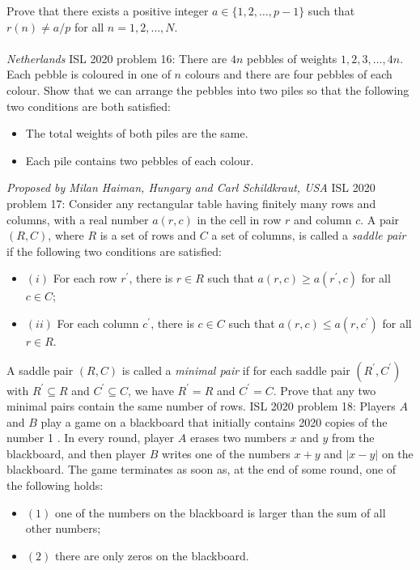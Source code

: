 Prove that there exists a positive integer $a \in \{ 1,2, \dots, p-1\}$ such that $r(n) \neq a/p$ for all $n = 1,2, \dots , N.$ \\\\
\textit{Netherlands} 
ISL 2020 problem 16:  There are $4n$ pebbles of weights $1, 2, 3, \dots, 4n.$ Each pebble is coloured in one of $n$ colours and there are four pebbles of each colour. Show that we can arrange the pebbles into two piles so that the following two conditions are both satisfied:
\begin{itemize}
  \item The total weights of both piles are the same.
  \item Each pile contains two pebbles of each colour.
\end{itemize}
\textit{Proposed by Milan Haiman, Hungary and Carl Schildkraut, USA} 
ISL 2020 problem 17:  Consider any rectangular table having finitely many rows and columns, with a real number $a(r, c)$ in the cell in row $r$ and column $c$. A pair $(R, C)$, where $R$ is a set of rows and $C$ a set of columns, is called a \textit{saddle pair} if the following two conditions are satisfied:
\begin{itemize}
  \item $(i)$ For each row $r^{\prime}$, there is $r \in R$ such that $a(r, c) \geqslant a\left(r^{\prime}, c\right)$ for all $c \in C$;
  \item $(ii)$ For each column $c^{\prime}$, there is $c \in C$ such that $a(r, c) \leqslant a\left(r, c^{\prime}\right)$ for all $r \in R$.
\end{itemize}
A saddle pair $(R, C)$ is called a \textit{minimal pair} if for each saddle pair $\left(R^{\prime}, C^{\prime}\right)$ with $R^{\prime} \subseteq R$ and $C^{\prime} \subseteq C$, we have $R^{\prime}=R$ and $C^{\prime}=C$. Prove that any two minimal pairs contain the same number of rows. 
ISL 2020 problem 18:  Players $A$ and $B$ play a game on a blackboard that initially contains 2020 copies of the number 1 . In every round, player $A$ erases two numbers $x$ and $y$ from the blackboard, and then player $B$ writes one of the numbers $x+y$ and $|x-y|$ on the blackboard. The game terminates as soon as, at the end of some round, one of the following holds:
\begin{itemize}
  \item $(1)$ one of the numbers on the blackboard is larger than the sum of all other numbers;
  \item $(2)$ there are only zeros on the blackboard.
\end{itemize}
